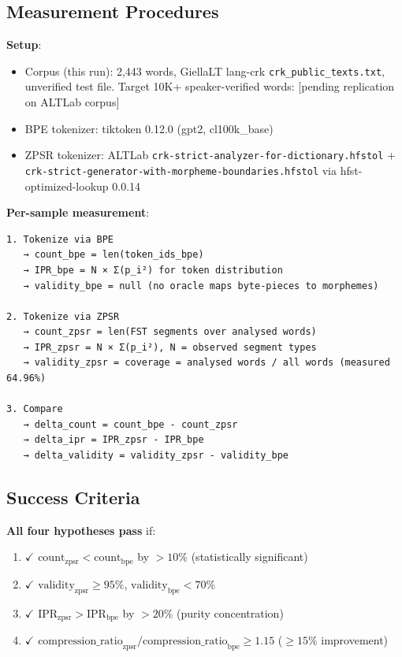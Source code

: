 \documentclass[11pt,oneside]{article}
\begin{document}
\subsection{Measurement Procedures}

\textbf{Setup}:
\begin{itemize}
  \item Corpus (this run): 2,443 words, GiellaLT lang-crk \texttt{crk\_public\_texts.txt}, unverified test file. Target 10K+ speaker-verified words: [pending replication on ALTLab corpus]
  \item BPE tokenizer: tiktoken 0.12.0 (gpt2, cl100k\_base)
  \item ZPSR tokenizer: ALTLab \texttt{crk-strict-analyzer-for-dictionary.hfstol} + \texttt{crk-strict-generator-with-morpheme-boundaries.hfstol} via hfst-optimized-lookup 0.0.14
\end{itemize}

\textbf{Per-sample measurement}:

\begin{lstlisting}
1. Tokenize via BPE
   → count_bpe = len(token_ids_bpe)
   → IPR_bpe = N × Σ(p_i²) for token distribution
   → validity_bpe = null (no oracle maps byte-pieces to morphemes)

2. Tokenize via ZPSR
   → count_zpsr = len(FST segments over analysed words)
   → IPR_zpsr = N × Σ(p_i²), N = observed segment types
   → validity_zpsr = coverage = analysed words / all words (measured 64.96%)

3. Compare
   → delta_count = count_bpe - count_zpsr
   → delta_ipr = IPR_zpsr - IPR_bpe
   → delta_validity = validity_zpsr - validity_bpe
\end{lstlisting}

\subsection{Success Criteria}

\textbf{All four hypotheses pass} if:

\begin{enumerate}
  \item $\checkmark$ $\text{count}_{\text{zpsr}} < \text{count}_{\text{bpe}}$ by $>10\%$ (statistically significant)
  \item $\checkmark$ $\text{validity}_{\text{zpsr}} \geq 95\%$, $\text{validity}_{\text{bpe}} < 70\%$
  \item $\checkmark$ $\text{IPR}_{\text{zpsr}} > \text{IPR}_{\text{bpe}}$ by $>20\%$ (purity concentration)
  \item $\checkmark$ $\text{compression\_ratio}_{\text{zpsr}} / \text{compression\_ratio}_{\text{bpe}} \geq 1.15$ ($\geq 15\%$ improvement)
\end{enumerate}
\end{document}

